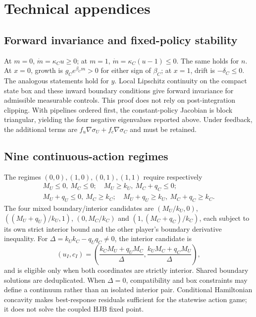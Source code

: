 \documentclass[11pt]{article}
\begin{document}
\clearpage



\clearpage\appendix
\section{Technical appendices}
\subsection{Forward invariance and fixed-policy stability}
At $m=0$, $\dot m=\kappa_Cu\geq0$; at $m=1$, $\dot m=\kappa_C(u-1)\leq0$. The same holds for $n$. At $x=0$, growth is $g_Ce^{\beta_Cm}>0$ for either sign of $\beta_C$; at $x=1$, drift is $-\delta_C\leq0$. The analogous statements hold for $y$. Local Lipschitz continuity on the compact state box and these inward boundary conditions give forward invariance for admissible measurable controls. This proof does not rely on post-integration clipping. With pipelines ordered first, the constant-policy Jacobian is block triangular, yielding the four negative eigenvalues reported above. Under feedback, the additional terms are $f_u\nabla\sigma_U+f_c\nabla\sigma_C$ and must be retained.

\subsection{Nine continuous-action regimes}
The regimes $(0,0),(1,0),(0,1),(1,1)$ require respectively
\begin{gather*}
 M_U\leq0,\ M_C\leq0;\quad M_U\geq k_U,\ M_C+q_C\leq0;\\
 M_U+q_U\leq0,\ M_C\geq k_C;\quad
 M_U+q_U\geq k_U,\ M_C+q_C\geq k_C.
\end{gather*}
The four mixed boundary/interior candidates are
$(M_U/k_U,0)$, $((M_U+q_U)/k_U,1)$, $(0,M_C/k_C)$ and $(1,(M_C+q_C)/k_C)$, each subject to its own strict interior bound and the other player's boundary derivative inequality. For $\Delta=k_Uk_C-q_Uq_C\ne0$, the interior candidate is
\begin{equation}
 (u_I,c_I)=\left(\frac{k_CM_U+q_UM_C}{\Delta},\frac{k_UM_C+q_CM_U}{\Delta}\right),
\end{equation}
and is eligible only when both coordinates are strictly interior. Shared boundary solutions are deduplicated. When $\Delta=0$, compatibility and box constraints may define a continuum rather than an isolated interior pair. Conditional Hamiltonian concavity makes best-response residuals sufficient for the statewise action game; it does not solve the coupled HJB fixed point.
\end{document}
